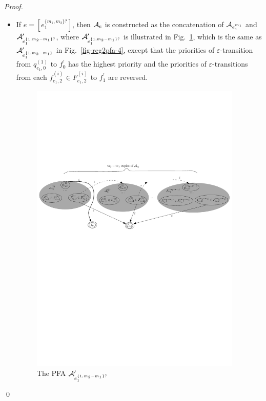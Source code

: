 \begin{proof}
\begin{itemize}
        \item If $e = [e_1^{\{m_1,m_2\}?}]$, then $\mathcal{A}_e$ is constructed as the concatenation of $\mathcal{A}_{e_1^{m_1}}$ and $\mathcal{A}^\prime_{e_1^{\{1,m_2-m_1\}?}}$, where $\mathcal{A}^\prime_{e_1^{\{1,m_2-m_1\}?}}$ is illustrated in Fig.~\ref{fig-reg2pfa-5}, which is the same as $\mathcal{A}^\prime_{e_1^{\{1,m_2-m_1\}}}$ in Fig.~\ref{fig-reg2pfa-4}, except that the priorities of $\varepsilon$-transition from $q^{(1)}_{e_1,0}$ to $f^\prime_0$ has the highest priority and  the priorities of $\varepsilon$-transitions from each $f^{(i)}_{e_1,2} \in F^{(i)}_{e_1,2}$ to $f^\prime_1$ are reversed.
            \begin{figure}[ht]
                \centering
                \includegraphics[width = 0.95\textwidth]{reg2pfa-5.pdf}
                \caption{The PFA $\mathcal{A}^\prime_{e_1^{\{1,m_2-m_1\}?}}$}
                \label{fig-reg2pfa-5}
            \end{figure}  
    \end{itemize}
    \qed
\end{proof}

